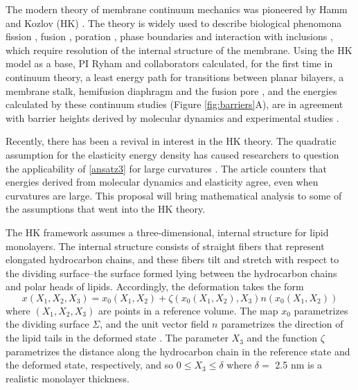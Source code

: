 The modern theory of membrane continuum mechanics 
was pioneered by Hamm and Kozlov (HK) \cite{Hamm2000}.
The theory is widely used to describe biological phenomona 
fission \cite{FrEsAkSh15, Maetal15, PhysRevE.79.031926},
fusion \cite{ChKo08, KoKo2002,Kuzmin7235,Aeffner2012},
poration \cite{Gaetal20}, phase boundaries and interaction with inclusions
\cite{SeLeMaEg17,Saetal20, Pietal20}, which require resolution of the internal structure of the membrane.  
Using the HK  model as a base,
PI Ryham and collaborators calculated, for the first time in continuum theory, a least energy path for transitions between planar bilayers, a membrane stalk,
hemifusion diaphragm and the fusion pore \cite{RyWaCo13,RyKlYaCo16},
and the energies calculated by these continuum studies (Figure \ref{fig:barriers}A),
are in agreement with barrier heights derived by molecular dynamics and experimental studies \cite{FrRoPi17}.  

Recently, there has been a revival in interest in the HK theory. The quadratic assumption
for the elasticity energy density has caused researchers to question the applicability of \eqref{ansatz3} for large curvatures \cite{PhysRevLett.117.188102, ARGUDO20161619}. 
The article \cite{C9SM02079A} counters that energies derived from molecular dynamics and elasticity agree, even when curvatures are large.
This proposal will bring mathematical analysis to some of the assumptions 
that went into the HK theory. 

The HK framework assumes a three-dimensional, internal structure for lipid monolayers.
The internal structure consists of straight fibers that represent elongated hydrocarbon chains, and these fibers
tilt and stretch with respect to the dividing surface--the surface formed lying between the hydrocarbon chains and polar heads of lipids.
Accordingly, the deformation takes the form 
\begin{equation}
  \label{LMdeformation}
x(X_1, X_2, X_3) = x_0(X_1, X_2) + \zeta(x_0(X_1, X_2), X_3) n(x_0(X_1, X_2))
\end{equation}
where $(X_1,X_2,X_3)$ are points in a reference volume.
The map $x_0$ parametrizes the dividing surface $\Sigma$, and the unit vector field $n$ parametrizes the
direction of the lipid tails in the deformed state \cite{doi:10.1021/jp075641w,KLAUDA20083074}.
The parameter $X_3$ and the function $\zeta$ parametrizes the distance along the hydrocarbon chain in the reference state
and the deformed state, respectively, and so $0 \leq X_3 \leq \delta$ where $\delta = $ 2.5 nm is a realistic monolayer thickness. 

